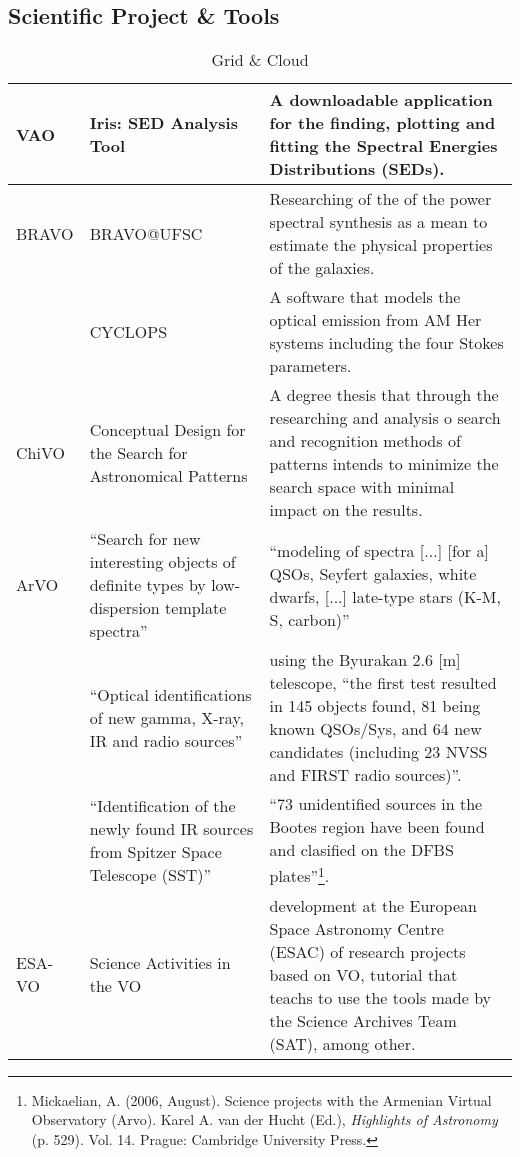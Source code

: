 
\subsection{Scientific Project \& Tools}
\begin{table*}[h!t]
	\centering
	\begin{tabular}{|l|p{4cm}|p{10cm}|}
	\hline
	VAO		& Iris: SED Analysis Tool & A downloadable application for the finding, plotting and fitting the Spectral Energies Distributions (SEDs). \\
	\hline
	BRAVO	& BRAVO@UFSC & Researching of the of the power spectral synthesis as a mean to estimate the physical properties of the galaxies.\\
			& CYCLOPS & A software that models the optical emission from AM Her systems including the four Stokes parameters.\\
	\hline
	ChiVO	& Conceptual Design for the Search for Astronomical Patterns & A degree thesis that through the researching and analysis o search and
							recognition methods of patterns intends to minimize the search space with minimal impact on the results. \\
	\hline
	ArVO	& ``Search for new interesting objects of definite types by low-dispersion template spectra'' & ``modeling of spectra [...] [for a] QSOs,
							Seyfert galaxies, white dwarfs, [...] late-type stars (K-M, S, carbon)'' \\
			& ``Optical identifications of new gamma, X-ray, IR and radio sources'' & using the Byurakan 2.6 [m] telescope, ``the first test resulted in 145 
							objects found, 81 being known QSOs/Sys, and 64 new candidates (including 23 NVSS and FIRST radio sources)''.\\
			& ``Identification of the newly found IR sources from Spitzer Space Telescope (SST)''& ``73 unidentified sources in the Bootes region have been 
							found and clasified on the DFBS plates''\footnote{Mickaelian, A. (2006, August). Science projects with the Armenian Virtual 
							Observatory (Arvo). Karel A.  van der Hucht (Ed.), \textit{Highlights of Astronomy} (p. 529). Vol. 14. Prague: Cambridge 
							University Press.}.\\
	\hline
	ESA-VO	& Science Activities in the VO & development at the European Space Astronomy Centre (ESAC) of research projects based on VO, tutorial that teachs to use the tools made by the Science Archives Team (SAT), among other.\\
	\hline
	\end{tabular}
	\caption{Grid \& Cloud}
	\label{table:st}
\end{table*}


